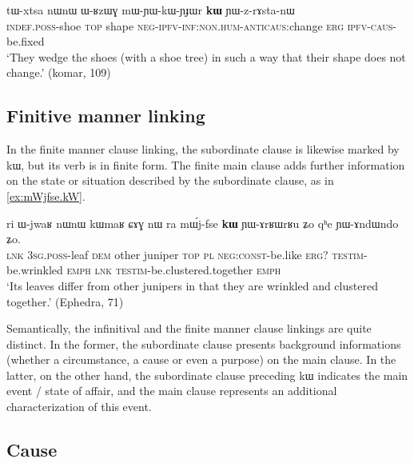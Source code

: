 \documentclass[oldfontcommands,oneside,a4paper,11pt]{article}
\newcommand{\ipa}[1]{{\phon #1}} %
\begin{document}
 

\begin{exe}
\ex \label{ex:mWYWkWYJWr}
\gll
\ipa{tɯ-xtsa}   	\ipa{nɯnɯ}   	\ipa{ɯ-ʁzɯɣ}   	\ipa{mɯ-ɲɯ-kɯ-ɲɟɯr}   	\ipa{\textbf{kɯ}}   	\ipa{ɲɯ-z-rɤsta-nɯ}   \\
\textsc{indef.poss}-shoe \textsc{top} shape \textsc{neg-ipfv-inf:non.hum-anticaus}:change \textsc{erg} \textsc{ipfv-caus}-be.fixed \\
\glt `They wedge the shoes (with a shoe tree)  in such a way that their shape does not change.' (komar, 109)
\end{exe}

\subsection{Finitive manner linking}
In the finite manner clause linking, the subordinate clause is likewise marked by \ipa{kɯ}, but its verb is in finite form. The  finite  main clause adds further information on the state or situation described by the subordinate clause, as in \ref{ex:mWjfse.kW}. 
 

 \begin{exe}
\ex \label{ex:mWjfse.kW}
\gll
\ipa{ri} 	\ipa{ɯ-jwaʁ} 	\ipa{nɯnɯ} 	\ipa{kɯmaʁ} 	\ipa{ɕɤɣ} 	\ipa{nɯ} \ipa{ra} 	\ipa{mɯ́j-fse} 	\ipa{\textbf{kɯ}} 	\ipa{ɲɯ-ɤrʁɯrʁu} 	\ipa{ʑo} 	\ipa{qʰe} 	\ipa{ɲɯ-ɤndɯndo} 	\ipa{ʑo.} \\
\textsc{lnk} \textsc{3sg.poss}-leaf \textsc{dem} other juniper \textsc{top} \textsc{pl} \textsc{neg:const}-be.like \textsc{erg?} \textsc{testim}-be.wrinkled \textsc{emph} \textsc{lnk}  \textsc{testim}-be.clustered.together \textsc{emph} \\
\glt `Its leaves differ from other junipers in that they are wrinkled and clustered together.' (Ephedra, 71)
 \end{exe}
 
Semantically,  the infinitival and the finite manner clause linkings are quite distinct. In the former, the subordinate clause presents background informations (whether a circumstance, a cause or even a purpose) on the main clause. In the latter, on the other hand, the subordinate clause preceding \ipa{kɯ} indicates the main event / state of affair, and the main clause represents an additional characterization of this event.


\subsection{Cause} \label{sec:cause}
\end{document}
